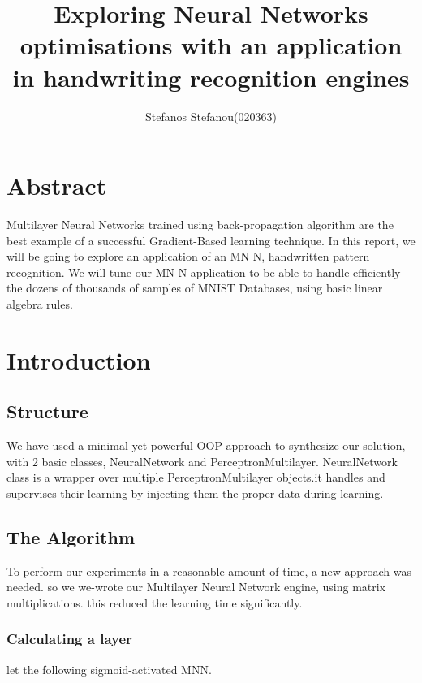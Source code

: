 \documentclass{proc}
\title{Exploring Neural Networks optimisations with an application in handwriting recognition engines}
\author{Stefanos Stefanou(020363)}
\begin{document}
	\maketitle
	\section{Abstract}
	Multilayer Neural Networks trained using back-propagation algorithm are the best example of a successful
	Gradient-Based learning technique. In this report, we will be going to explore an application of an MN N, handwritten pattern recognition. We will tune our MN N application to be able to handle efficiently the dozens of thousands of samples of MNIST Databases, using basic linear algebra rules.
	\section{Introduction}
	\subsection{Structure}
	We have used a minimal yet powerful OOP approach to synthesize our solution, with 2 basic classes, NeuralNetwork and PerceptronMultilayer. NeuralNetwork class is a wrapper over multiple PerceptronMultilayer objects.it handles and supervises their learning by injecting them the proper data during learning.
	\subsection{The Algorithm}
	To perform our experiments in a reasonable amount of time, a new approach was needed. so we we-wrote our Multilayer Neural Network engine, using matrix multiplications. this reduced the learning time significantly.
	\subsubsection{Calculating a layer}
	let the following sigmoid-activated MNN.
	
\end{document}
